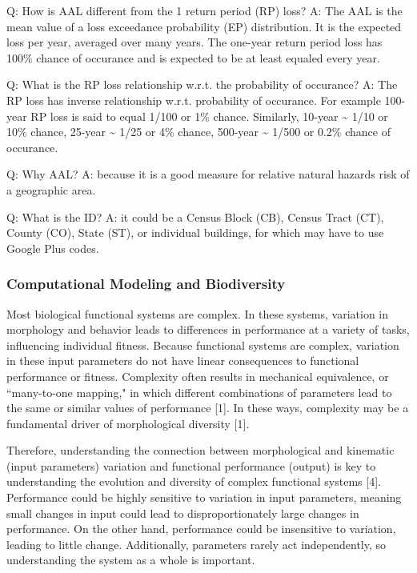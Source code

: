 \documentclass[
]{article}
\begin{document}
Q: How is AAL different from the 1 return period (RP) loss? A: The AAL
is the mean value of a loss exceedance probability (EP) distribution. It
is the expected loss per year, averaged over many years. The one-year
return period loss has 100\% chance of occurance and is expected to be
at least equaled every year.

Q: What is the RP loss relationship w.r.t. the probability of occurance?
A: The RP loss has inverse relationship w.r.t. probability of occurance.
For example 100-year RP loss is said to equal 1/100 or 1\% chance.
Similarly, 10-year \textasciitilde{} 1/10 or 10\% chance, 25-year
\textasciitilde{} 1/25 or 4\% chance, 500-year \textasciitilde{} 1/500
or 0.2\% chance of occurance.

Q: Why AAL? A: because it is a good measure for relative natural hazards
risk of a geographic area.

Q: What is the ID? A: it could be a Census Block (CB), Census Tract
(CT), County (CO), State (ST), or individual buildings, for which may
have to use Google Plus codes.

\hypertarget{computational-modeling-and-biodiversity}{%
\subsubsection{Computational Modeling and
Biodiversity}\label{computational-modeling-and-biodiversity}}

Most biological functional systems are complex. In these systems,
variation in morphology and behavior leads to differences in performance
at a variety of tasks, influencing individual fitness. Because
functional systems are complex, variation in these input parameters do
not have linear consequences to functional performance or fitness.
Complexity often results in mechanical equivalence, or ``many-to-one
mapping," in which different combinations of parameters lead to the same
or similar values of performance {[}1{]}. In these ways, complexity may
be a fundamental driver of morphological diversity {[}1{]}.

Therefore, understanding the connection between morphological and
kinematic (input parameters) variation and functional performance
(output) is key to understanding the evolution and diversity of complex
functional systems {[}4{]}. Performance could be highly sensitive to
variation in input parameters, meaning small changes in input could lead
to disproportionately large changes in performance. On the other hand,
performance could be insensitive to variation, leading to little change.
Additionally, parameters rarely act independently, so understanding the
system as a whole is important.
\end{document}
